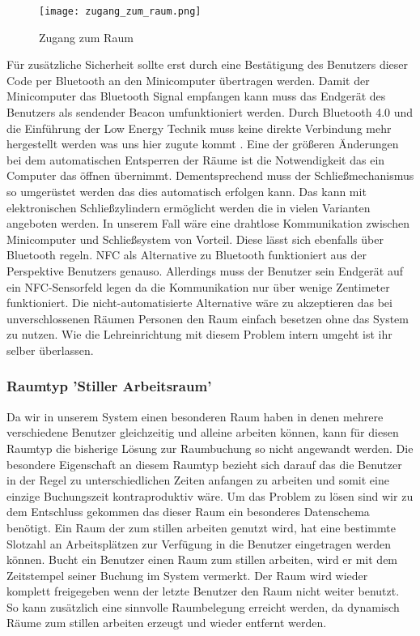 \begin{figure}
	\centering
	\texttt{[image: zugang\_zum\_raum.png]}
	\caption{Zugang zum Raum}
\end{figure}

Für zusätzliche Sicherheit sollte erst durch eine Bestätigung des Benutzers
dieser Code per Bluetooth an den Minicomputer übertragen werden. Damit der
Minicomputer das Bluetooth Signal empfangen kann muss das Endgerät des
Benutzers als sendender Beacon umfunktioniert werden. Durch Bluetooth 4.0 und
die Einführung der Low Energy Technik muss keine direkte Verbindung mehr
hergestellt werden was uns hier zugute kommt \cite{[Quelle](https://californiaconsultants.org/wp-content/uploads/2014/05/CNSV-1205-Decuir.pdf)}.
Eine der größeren Änderungen bei dem automatischen Entsperren der Räume ist die
Notwendigkeit das ein Computer das öffnen übernimmt. Dementsprechend muss der
Schließmechanismus so umgerüstet werden das dies automatisch erfolgen kann.
Das kann mit elektronischen Schließzylindern ermöglicht werden die in vielen
Varianten angeboten werden. In unserem Fall wäre eine drahtlose Kommunikation
zwischen Minicomputer und Schließsystem von Vorteil. Diese lässt sich ebenfalls
über Bluetooth regeln. 
NFC als Alternative zu Bluetooth funktioniert aus der Perspektive Benutzers
genauso. Allerdings muss der Benutzer sein Endgerät auf ein NFC-Sensorfeld
legen da die Kommunikation nur über wenige Zentimeter funktioniert.
Die nicht-automatisierte Alternative wäre zu akzeptieren das bei
unverschlossenen Räumen Personen den Raum einfach besetzen ohne das System zu
nutzen. Wie die Lehreinrichtung mit diesem Problem intern umgeht ist ihr selber
überlassen.

\subsubsection{Raumtyp 'Stiller Arbeitsraum'}
\label{sec:Raumtyp 'Stiller Arbeitsraum'}

Da wir in unserem System einen besonderen Raum haben in denen mehrere
verschiedene Benutzer gleichzeitig und alleine arbeiten können, kann für diesen
Raumtyp die bisherige Lösung zur Raumbuchung so nicht angewandt werden.
Die besondere Eigenschaft an diesem Raumtyp bezieht sich darauf das die
Benutzer in der Regel zu unterschiedlichen Zeiten anfangen zu arbeiten und
somit eine einzige Buchungszeit kontraproduktiv wäre. Um das Problem zu lösen
sind wir zu dem Entschluss gekommen das dieser Raum ein besonderes Datenschema
benötigt. Ein Raum der zum stillen arbeiten genutzt wird, hat eine bestimmte
Slotzahl an Arbeitsplätzen zur Verfügung in die Benutzer eingetragen werden
können. Bucht ein Benutzer einen Raum zum stillen arbeiten, wird er mit dem
Zeitstempel seiner Buchung im System vermerkt. Der Raum wird wieder komplett
freigegeben wenn der letzte Benutzer den Raum nicht weiter benutzt. So kann
zusätzlich eine sinnvolle Raumbelegung erreicht werden, da dynamisch Räume zum
stillen arbeiten erzeugt und wieder entfernt werden.

